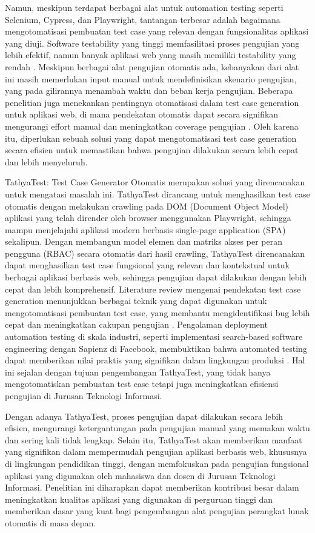 Namun, meskipun terdapat berbagai alat untuk automation testing seperti Selenium, Cypress, dan Playwright, tantangan terbesar adalah bagaimana mengotomatisasi pembuatan test case yang relevan dengan fungsionalitas aplikasi yang diuji. Software testability yang tinggi memfasilitasi proses pengujian yang lebih efektif, namun banyak aplikasi web yang masih memiliki testability yang rendah \parencite{garousi2019testability}. Meskipun berbagai alat pengujian otomatis ada, kebanyakan dari alat ini masih memerlukan input manual untuk mendefinisikan skenario pengujian, yang pada gilirannya menambah waktu dan beban kerja pengujian. Beberapa penelitian juga menekankan pentingnya otomatisasi dalam test case generation untuk aplikasi web, di mana pendekatan otomatis dapat secara signifikan mengurangi effort manual dan meningkatkan coverage pengujian \parencite{leotta2021,romano2022}. Oleh karena itu, diperlukan sebuah solusi yang dapat mengotomatisasi test case generation secara efisien untuk memastikan bahwa pengujian dilakukan secara lebih cepat dan lebih menyeluruh.

TathyaTest: Test Case Generator Otomatis merupakan solusi yang direncanakan untuk mengatasi masalah ini. TathyaTest dirancang untuk menghasilkan test case otomatis dengan melakukan crawling pada DOM (Document Object Model) aplikasi yang telah dirender oleh browser menggunakan Playwright, sehingga mampu menjelajahi aplikasi modern berbasis single-page application (SPA) sekalipun. Dengan membangun model elemen dan matriks akses per peran pengguna (RBAC) secara otomatis dari hasil crawling, TathyaTest direncanakan dapat menghasilkan test case fungsional yang relevan dan kontekstual untuk berbagai aplikasi berbasis web, sehingga pengujian dapat dilakukan dengan lebih cepat dan lebih komprehensif. Literature review mengenai pendekatan test case generation menunjukkan berbagai teknik yang dapat digunakan untuk mengotomatisasi pembuatan test case, yang membantu mengidentifikasi bug lebih cepat dan meningkatkan cakupan pengujian \parencite{setiani2019,sahoo2021}. Pengalaman deployment automation testing di skala industri, seperti implementasi search-based software engineering dengan Sapienz di Facebook, membuktikan bahwa automated testing dapat memberikan nilai praktis yang signifikan dalam lingkungan produksi \parencite{alshahwan2018}. Hal ini sejalan dengan tujuan pengembangan TathyaTest, yang tidak hanya mengotomatiskan pembuatan test case tetapi juga meningkatkan efisiensi pengujian di Jurusan Teknologi Informasi.

Dengan adanya TathyaTest, proses pengujian dapat dilakukan secara lebih efisien, mengurangi ketergantungan pada pengujian manual yang memakan waktu dan sering kali tidak lengkap. Selain itu, TathyaTest akan memberikan manfaat yang signifikan dalam mempermudah pengujian aplikasi berbasis web, khususnya di lingkungan pendidikan tinggi, dengan memfokuskan pada pengujian fungsional aplikasi yang digunakan oleh mahasiswa dan dosen di Jurusan Teknologi Informasi. Penelitian ini diharapkan dapat memberikan kontribusi besar dalam meningkatkan kualitas aplikasi yang digunakan di perguruan tinggi dan memberikan dasar yang kuat bagi pengembangan alat pengujian perangkat lunak otomatis di masa depan.

